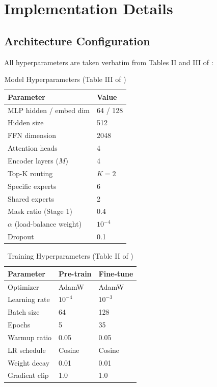 \documentclass[conference]{IEEEtran}
\begin{document}
\section{Implementation Details}

\subsection{Architecture Configuration}

All hyperparameters are taken verbatim from Tables II and III of \cite{eegmoe2026}:

\begin{table}[h]
\centering
\caption{Model Hyperparameters (Table III of \cite{eegmoe2026})}
\label{tab:hyperparams}
\begin{tabular}{@{}ll@{}}
\toprule
\textbf{Parameter} & \textbf{Value} \\
\midrule
MLP hidden / embed dim & 64 / 128 \\
Hidden size & 512 \\
FFN dimension & 2048 \\
Attention heads & 4 \\
Encoder layers ($M$) & 4 \\
Top-K routing & $K = 2$ \\
Specific experts & 6 \\
Shared experts & 2 \\
Mask ratio (Stage 1) & 0.4 \\
$\alpha$ (load-balance weight) & $10^{-4}$ \\
Dropout & 0.1 \\
\bottomrule
\end{tabular}
\end{table}

\begin{table}[h]
\centering
\caption{Training Hyperparameters (Table II of \cite{eegmoe2026})}
\label{tab:training}
\begin{tabular}{@{}lll@{}}
\toprule
\textbf{Parameter} & \textbf{Pre-train} & \textbf{Fine-tune} \\
\midrule
Optimizer & AdamW & AdamW \\
Learning rate & $10^{-4}$ & $10^{-3}$ \\
Batch size & 64 & 128 \\
Epochs & 5 & 35 \\
Warmup ratio & 0.05 & 0.05 \\
LR schedule & Cosine & Cosine \\
Weight decay & 0.01 & 0.01 \\
Gradient clip & 1.0 & 1.0 \\
\bottomrule
\end{tabular}
\end{table}
\end{document}

